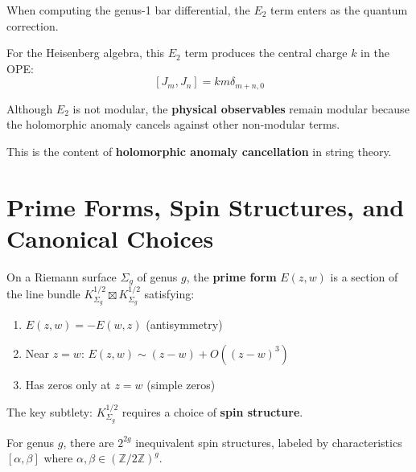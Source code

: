 \begin{remark}\label{rem:bar-E2}
When computing the genus-1 bar differential, the $E_2$ term enters as the quantum correction.

For the Heisenberg algebra, this $E_2$ term produces 
the central charge $k$ in the OPE:
$$[J_m, J_n] = k m \delta_{m+n,0}$$
\end{remark}

\begin{corollary}\label{cor:modular-inv-g1}
Although $E_2$ is not modular, the \textbf{physical observables} remain modular because 
the holomorphic anomaly cancels against other non-modular terms.

This is the content of \textbf{holomorphic anomaly cancellation} in string theory.
\end{corollary}

\section{Prime Forms, Spin Structures, and Canonical Choices}
\label{sec:prime-forms-spin}

\begin{definition}\label{def:prime-form-spin}
On a Riemann surface $\Sigma_g$ of genus $g$, the \textbf{prime form} $E(z,w)$ is 
a section of the line bundle $K_{\Sigma_g}^{1/2} \boxtimes K_{\Sigma_g}^{1/2}$ satisfying:
\begin{enumerate}
\item $E(z,w) = -E(w,z)$ (antisymmetry)
\item Near $z=w$: $E(z,w) \sim (z-w) + O((z-w)^3)$
\item Has zeros only at $z=w$ (simple zeros)
\end{enumerate}
\end{definition}

\begin{remark}\label{rem:spin-structure-prime}
The key subtlety: $K_{\Sigma_g}^{1/2}$ requires a choice of \textbf{spin structure}.

For genus $g$, there are $2^{2g}$ inequivalent spin structures, labeled by 
characteristics $[\alpha, \beta]$ where $\alpha, \beta \in (\mathbb{Z}/2\mathbb{Z})^g$.
\end{remark}

